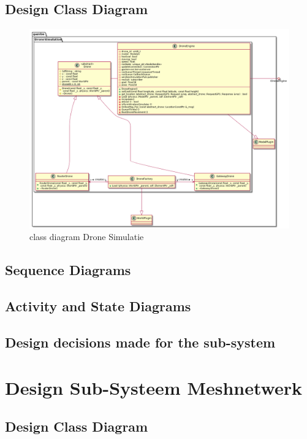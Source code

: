 \documentclass[a4paper, 11pt, oneside]{report}
\begin{document}
\subsection{Design Class Diagram}
\label{DetailedDesign:DroneSimumlatie:class}
\begin{figure}[H]
	\begin{center}\includegraphics[width=\linewidth]{UML/out/DroneSimulation/class/DroneSimClass/DroneSimClass.png}\end{center}
	\caption{class diagram Drone Simulatie}
	\label{fig:class:dronesimulatie}
\end{figure}
\subsection{Sequence Diagrams}
\label{DetailedDesign:DroneSimumlatie:sequence}
\subsection{Activity and State Diagrams}
\label{DetailedDesign:DroneSimumlatie:Activity}
\subsection{Design decisions made for the sub-system}

\section{Design Sub-Systeem Meshnetwerk}
\label{DetailedDesign:MeshNetwerk}
\subsection{Design Class Diagram}
\label{DetailedDesign:MeshNetwerk:class}
\label{DetailedDesign:DroneSimumlatie:class}
\end{document}
